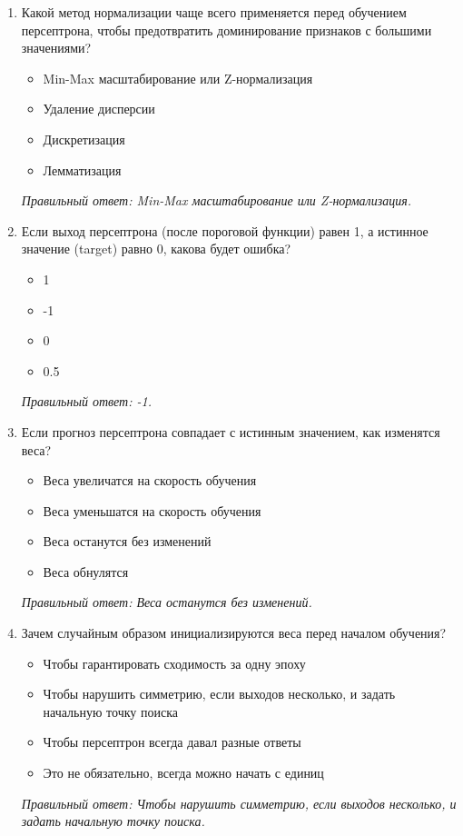 \begin{enumerate}[label=\textbf{\arabic*.}, leftmargin=0pt, itemsep=1.2em]
\item Какой метод нормализации чаще всего применяется перед обучением персептрона, чтобы предотвратить доминирование признаков с большими значениями?
\begin{itemize}[label=$\square$, leftmargin=1.5cm, itemsep=0.2em, topsep=0.3em]
\item Min-Max масштабирование или Z-нормализация
\item Удаление дисперсии
\item Дискретизация
\item Лемматизация
\end{itemize}
{\small\textit{Правильный ответ: Min-Max масштабирование или Z-нормализация.}}

\item Если выход персептрона (после пороговой функции) равен 1, а истинное значение (target) равно 0, какова будет ошибка?
\begin{itemize}[label=$\square$, leftmargin=1.5cm, itemsep=0.2em, topsep=0.3em]
\item 1
\item -1
\item 0
\item 0.5
\end{itemize}
{\small\textit{Правильный ответ: -1.}}

\item Если прогноз персептрона совпадает с истинным значением, как изменятся веса?
\begin{itemize}[label=$\square$, leftmargin=1.5cm, itemsep=0.2em, topsep=0.3em]
\item Веса увеличатся на скорость обучения
\item Веса уменьшатся на скорость обучения
\item Веса останутся без изменений
\item Веса обнулятся
\end{itemize}
{\small\textit{Правильный ответ: Веса останутся без изменений.}}

\item Зачем случайным образом инициализируются веса перед началом обучения?
\begin{itemize}[label=$\square$, leftmargin=1.5cm, itemsep=0.2em, topsep=0.3em]
\item Чтобы гарантировать сходимость за одну эпоху
\item Чтобы нарушить симметрию, если выходов несколько, и задать начальную точку поиска
\item Чтобы персептрон всегда давал разные ответы
\item Это не обязательно, всегда можно начать с единиц
\end{itemize}
{\small\textit{Правильный ответ: Чтобы нарушить симметрию, если выходов несколько, и задать начальную точку поиска.}}


\end{enumerate}
